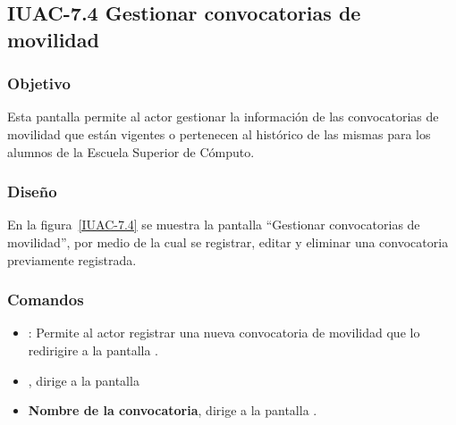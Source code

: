 \subsection{IUAC-7.4 Gestionar convocatorias de movilidad}
 
\subsubsection{Objetivo}

Esta pantalla permite al actor  gestionar la información de las convocatorias de movilidad que están vigentes o pertenecen al histórico de las mismas para los alumnos de la Escuela Superior de Cómputo.

\subsubsection{Diseño}

En la figura~\ref{IUAC-7.4} se muestra la pantalla ``Gestionar convocatorias de movilidad'', por medio de la cual se registrar, editar y eliminar una convocatoria previamente registrada. \\


\subsubsection{Comandos}
\begin{itemize}
	\item {}: Permite al actor registrar una nueva convocatoria de movilidad que lo redirigire a la pantalla .
	\item {}, dirige a la pantalla 
	\item \textbf{Nombre de la convocatoria}, dirige a la pantalla .
\end{itemize}
